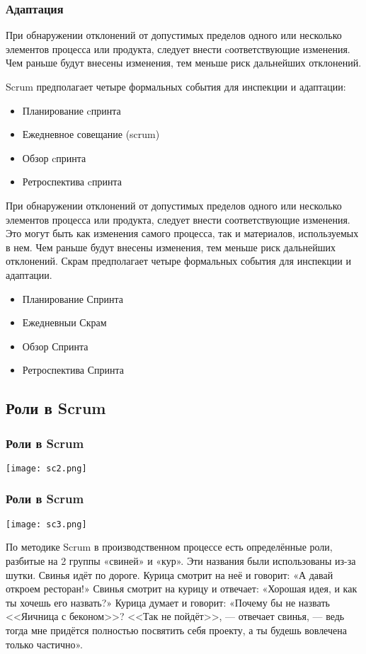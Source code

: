 \documentclass{../industrial-development}
\begin{document}
\begin{frame} \frametitle{Адаптация}
\begin{block}{}
При обнаружении \alert{отклонений} от допустимых пределов одного или несколько элементов процесса или продукта, следует внести  cоответствующие изменения. Чем \alert{раньше} будут внесены изменения, тем \alert{меньше} риск дальнейших отклонений.
\end{block}
Scrum предполагает четыре формальных события для \alert{инспекции} и \alert{адаптации:}
\begin{itemize}
\item Планирование cпринта
\item Ежедневное совещание (scrum)
\item Обзор cпринта
\item Ретроспектива cпринта
\end {itemize}
\end{frame}
\lecturenotes
\begin{block}{}
При обнаружении отклонений от допустимых пределов одного или несколько элементов
процесса или продукта, следует внести соответствующие изменения. Это могут быть как
изменения самого процесса, так и материалов, используемых в нем. Чем раньше будут
внесены изменения, тем меньше риск дальнейших отклонений.
Скрам предполагает четыре формальных события для инспекции и адаптации.
\begin{itemize}
\item Планирование Спринта
\item Ежедневныи Скрам
\item Обзор Спринта
\item Ретроспектива Спринта
\end {itemize}
\end {block}

\subsection{Роли в Scrum}

\begin{frame} \frametitle{Роли в Scrum}
	\centerline{\texttt{[image: sc2.png]}}
\end{frame}

\begin{frame} \frametitle{Роли в Scrum}
	\centerline{\texttt{[image: sc3.png]}}
\end{frame}

\lecturenotes
По методике Scrum в производственном процессе есть определённые роли, разбитые на 2 группы \alert{«свиней»} и \alert{«кур»}. Эти названия были использованы из-за шутки.
Свинья идёт по дороге. Курица смотрит на неё и говорит: «А давай откроем ресторан!» Свинья смотрит на курицу и отвечает: «Хорошая идея, и как ты хочешь его назвать?» Курица думает и говорит: «Почему бы не назвать <<Яичница с беконом>>? <<Так не пойдёт>>, — отвечает свинья, — ведь тогда мне придётся полностью посвятить себя проекту, а ты будешь вовлечена только частично».
\end{document}
